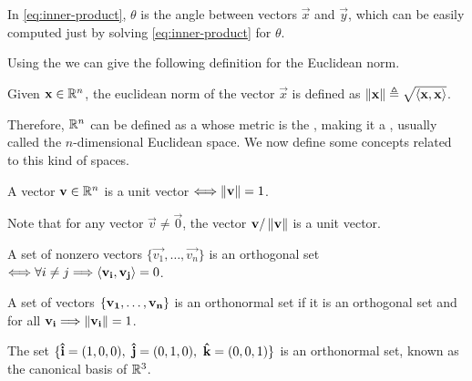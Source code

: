 \begin{remark}
    In \eqref{eq:inner-product}, $\theta$ is the angle between vectors $\vec{x}$ and $\vec{y}$, which can be easily 
    computed just by solving \eqref{eq:inner-product} for $\theta$.
\end{remark}

Using the  we can give the following definition for the Euclidean norm.

\begin{defn}\label{def:euclidean-norm}
    Given $\vec{x}\in\Rtn$, the euclidean norm of the vector $\vec{x}$ is defined as $\left\Vert \mathbf{x} \right\Vert\triangleq
    \sqrt{\langle \mathbf{x}, \mathbf{x} \rangle}$. 
\end{defn}

Therefore, $\Rtn$ can be defined as a  whose metric is the , making it
a , usually called the $n$-dimensional Euclidean space. We now define some concepts related
to this kind of spaces.

\begin{defn}
    A vector $\vec{v}\in\Rtn$ is a unit vector $\Longleftrightarrow\left\Vert \mathbf{v} \right\Vert = 1$.
\end{defn}

\begin{remark}
    Note that for any vector $\vec{v}\neq\vec{0}$, the vector $\mathbf{v} / \left\Vert \mathbf{v} \right\Vert$ is a unit vector.
\end{remark}

\begin{defn}[Orthogonality]
    A set of nonzero vectors $\{\vec{v_1}, \ldots, \vec{v_n}\}$ is an orthogonal set $\Longleftrightarrow\forall i\neq j\Longrightarrow
    \langle \mathbf{v_i}, \mathbf{v_j} \rangle = 0$.
\end{defn}

\begin{defn}
    A set of vectors $\{ \mathbf{v_1}, \ldots, \mathbf{v_n} \}$ is an orthonormal set if it is an orthogonal set and for all 
    $\mathbf{v_i}\Longrightarrow\left\Vert \mathbf{v_i} \right\Vert = 1$.
\end{defn}

\begin{example}
    The set $\{ \mathbf{\hat{i}} = (1, 0, 0),\ \mathbf{\hat{j}} = (0, 1, 0),\ \mathbf{\hat{k}} = (0, 0, 1) \}$ is an orthonormal set, known as the canonical 
    basis of $\R^3$.
\end{example}

